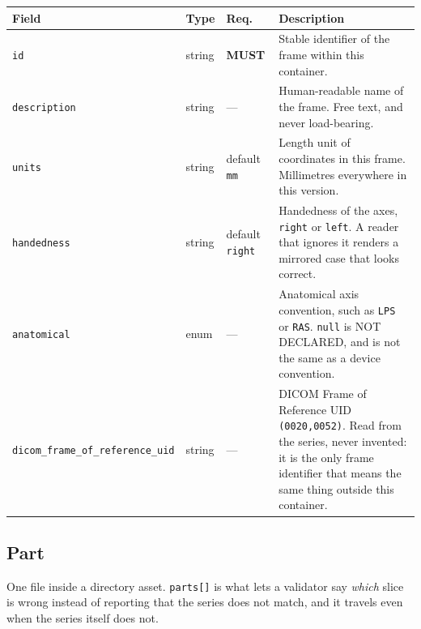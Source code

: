 \documentclass[11pt,a4paper]{article}
\newcommand{\MUST}{\textcolor{uosred}{\textbf{MUST}}}
\newcommand{\code}[1]{\texttt{\small #1}}
\begin{document}
\begin{longtable}{L{3.5cm} L{3.0cm} C{1.4cm} L{6.4cm}}
\toprule
\textbf{Field} & \textbf{Type} & \textbf{Req.} & \textbf{Description}\\
\midrule
\endhead
\code{id} & string & \MUST{} & Stable identifier of the frame within this container.\\
\code{description} & string & --- & Human-readable name of the frame. Free text, and never load-bearing.\\
\code{units} & string & default \code{mm} & Length unit of coordinates in this frame. Millimetres everywhere in this version.\\
\code{handedness} & string & default \code{right} & Handedness of the axes, \code{right} or \code{left}. A reader that ignores it renders a mirrored case that looks correct.\\
\code{anatomical} & enum & --- & Anatomical axis convention, such as \code{LPS} or \code{RAS}. \code{null} is NOT DECLARED, and is not the same as a device convention.\\
\code{dicom\_frame\_of\_reference\_uid} & string & --- & DICOM Frame of Reference UID \code{(0020,0052)}. Read from the series, never invented: it is the only frame identifier that means the same thing outside this container.\\
\bottomrule
\end{longtable}

\subsection{Part}

One file inside a directory asset. \code{parts[]} is what lets a validator say \emph{which} slice is wrong instead of reporting that the series does not match, and it travels even when the series itself does not.
\end{document}
